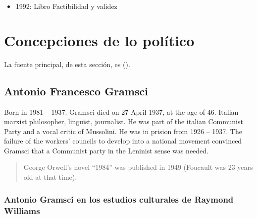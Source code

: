 \documentclass[
  letterpaper,
  DIV=11,
  numbers=noendperiod]{scrreprt}
\begin{document}
\begin{itemize}
\begin{itemize}
    \begin{quote}
    La esfera pública fue subsumida en el marco del consumo, una empresa
    conducida por el mercado que en parte consiente y en parte manipula
    a una masa cultural tan acrítica como apolítica. {[}p160{]}
    \end{quote}
  \item
    La democracia parlamentario moderna consiste en gran medida en la
    manipulación de los votantes en manos de las élites políticas.
  \item
    En un estado de bienestar social que fundamentalmente administra,
    distribuye y mantiene. Los intereses ``políticos'' de los ciudadanos
    están constantemente subsumidos en actos administrativos {[}p
    211{]}.
  \end{itemize}
\item
  1992: Libro Factibilidad y validez
\end{itemize}

\chapter{Concepciones de lo
político}\label{concepciones-de-lo-poluxedtico}

La fuente principal, de esta sección, es
().

\section{Antonio Francesco Gramsci}\label{antonio-francesco-gramsci}

Born in 1981 -- 1937. Gramsci died on 27 April 1937, at the age of 46.
Italian marxist philosopher, linguist, journalist. He was part of the
italian Communist Party and a vocal critic of Mussolini. He was in
prision from 1926 -- 1937. The failure of the workers' councils to
develop into a national movement convinced Gramsci that a Communist
party in the Leninist sense was needed.

\begin{quote}
George Orwell's novel ``1984'' was published in 1949 (Foucault was 23
years old at that time).
\end{quote}

\subsection{Antonio Gramsci en los estudios culturales de Raymond
Williams}\label{antonio-gramsci-en-los-estudios-culturales-de-raymond-williams}
\end{document}
